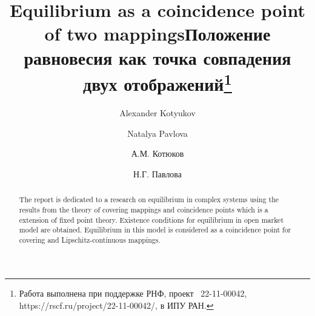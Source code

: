 \begin{englishtitle} %
\title{Equilibrium as a coincidence point of two mappings}
\author{Alexander Kotyukov  \and  Natalya Pavlova
}

\maketitle

\begin{abstract}
The report is dedicated to a research on equilibrium in complex systems using the results from the theory of covering mappings and coincidence points which is a extension of fixed point theory. Existence conditions for equilibrium in open market model are obtained. Equilibrium in this model is considered as a coincidence point for covering and Lipschitz-continuous mappings.

\end{abstract}
\end{englishtitle}


\iffalse
%
%


\documentclass[12pt]{llncs}


\usepackage{iftex}

\ifPDFTeX
\usepackage[T2A]{fontenc}
\usepackage[utf8]{inputenc} %
\usepackage[english,russian]{babel}
\fi

\usepackage{todonotes}

\usepackage[russian]{nla}


\fi

\title{Положение равновесия как точка совпадения \\ двух отображений\thanks{Работа выполнена при поддержке РНФ, проект \textnumero~22-11-00042, https://rscf.ru/project/22-11-00042/, в ИПУ РАН.}}
\author{А.М. Котюков    \and    Н.Г. Павлова
}


